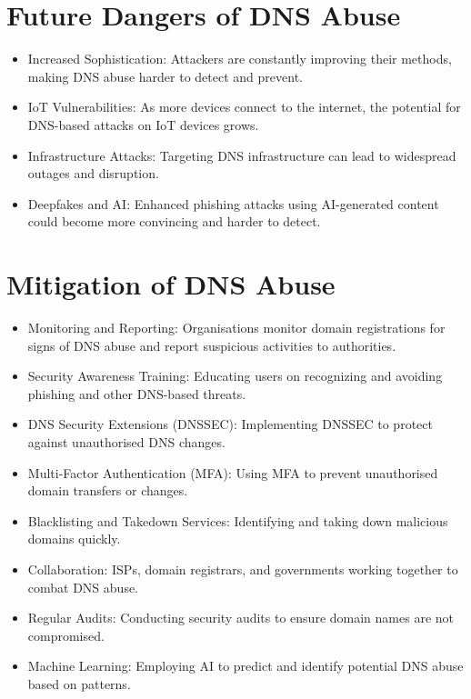 \section*{Future Dangers of DNS Abuse}

 \begin{itemize}
    \item Increased Sophistication: Attackers are constantly improving their methods, making DNS abuse harder to detect and prevent. \cite{icann2022dnsabusetrends}
    \item IoT Vulnerabilities: As more devices connect to the internet, the potential for DNS-based attacks on IoT devices grows. \cite{circleid2020dnstrends}
    \item Infrastructure Attacks: Targeting DNS infrastructure can lead to widespread outages and disruption. \cite{dotmagazine2022dnsabuse}
    \item Deepfakes and AI: Enhanced phishing attacks using AI-generated content could become more convincing and harder to detect. \cite{icann2022dnsabusetrends}
\end{itemize}

\section*{Mitigation of DNS Abuse}

\begin{itemize}
    \item Monitoring and Reporting: Organisations monitor domain registrations for signs of DNS abuse and report suspicious activities to authorities. \cite{icannndnssec}
    \item Security Awareness Training: Educating users on recognizing and avoiding phishing and other DNS-based threats.
    \item DNS Security Extensions (DNSSEC): Implementing DNSSEC to protect against unauthorised DNS changes. \cite{icannndnssec}
    \item Multi-Factor Authentication (MFA): Using MFA to prevent unauthorised domain transfers or changes. \cite{icannndnssec}
    \item Blacklisting and Takedown Services: Identifying and taking down malicious domains quickly. \cite{icannndnssec}
    \item Collaboration: ISPs, domain registrars, and governments working together to combat DNS abuse.
    \item Regular Audits: Conducting security audits to ensure domain names are not compromised.
    \item Machine Learning: Employing AI to predict and identify potential DNS abuse based on patterns. \cite{icannndnssec}
\end{itemize}



